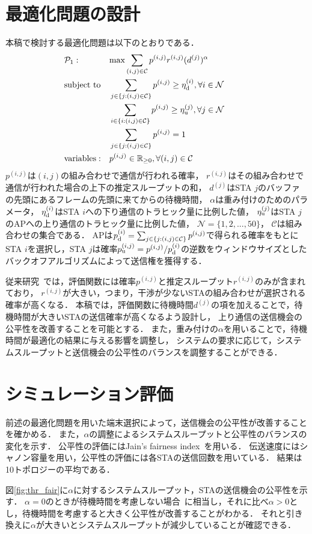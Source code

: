 \documentclass[twocolumn, a4paper]{ieicejsp}
\begin{document}
\section{最適化問題の設計 \label{方法}}
本稿で検討する最適化問題は以下のとおりである．
\begin{align}
	&{\mathcal P}_1: && {\rm max} \sum_{(i,j)\in{\mathcal C}} p^{(i,j)}r^{(i,j)}(d^{(j)})^{\alpha} &&&&&& \\
	&{\rm subject\ to} && \sum_{j\in\{j:(i,j)\in{\mathcal C}\}} p^{(i,j)} \geq \eta_{\rm d}^{(i)}, \forall i\in {\mathcal N}  \\
	&&& \sum_{i\in\{i:(i,j)\in{\mathcal C}\}} p^{(i,j)} \geq \eta_{\rm u}^{(j)}, \forall j\in {\mathcal N}  \\
	&&& \sum_{j\in\{j:(i,j)\in{\mathcal C}\}} p^{(i,j)}=1 \\
	&{\rm variables:} && p^{(i,j)} \in {\mathbb R}_{\geq 0},\forall(i,j)\in {\mathcal C}
\end{align}
$p^{(i,j)}$は$(i,j)$の組み合わせで通信が行われる確率，
$r^{(i,j)}$はその組み合わせで通信が行われた場合の上下の推定スループットの和，
$d^{(j)}$はSTA $j$のバッファの先頭にあるフレームの先頭に来てからの待機時間，
$\alpha$は重み付けのためのパラメータ，
$\eta_{\rm d}^{(i)}$はSTA $i$への下り通信のトラヒック量に比例した値，
$\eta_{\rm u}^{(j)}$はSTA $j$のAPへの上り通信のトラヒック量に比例した値，
${\mathcal N} = \{1,2,...,50\}$，
${\mathcal C}$は組み合わせの集合である．
APは$p_{\rm d}^{(i)}=\sum_{j\in\{j:(i,j)\in{\mathcal C}\}}p^{(i,j)}$で得られる確率をもとにSTA $i$を選択し，STA $j$は確率$p_{\rm u}^{(i,j)}=p^{(i,j)}/p_{\rm d}^{(i)}$の逆数をウィンドウサイズとしたバックオフアルゴリズムによって送信権を獲得する．
\par
従来研究~\cite{promac}では，評価関数には確率$p^{(i,j)}$と推定スループット$r^{(i,j)}$のみが含まれており，
$r^{(i,j)}$が大きい，つまり，干渉が少ないSTAの組み合わせが選択される確率が高くなる．
本稿では，評価関数に待機時間$d^{(j)}$の項を加えることで，待機時間が大きいSTAの送信確率が高くなるよう設計し，
上り通信の送信機会の公平性を改善することを可能とする．
また，重み付けの$\alpha$を用いることで，待機時間が最適化の結果に与える影響を調整し，
システムの要求に応じて，システムスループットと送信機会の公平性のバランスを調整することができる．

\section{シミュレーション評価 \label{評価}}
前述の最適化問題を用いた端末選択によって，送信機会の公平性が改善することを確かめる．
また，$\alpha$の調整によるシステムスループットと公平性のバランスの変化を示す．
公平性の評価にはJain's fairness index~\cite{fair}を用いる．
伝送速度にはシャノン容量を用い，公平性の評価には各STAの送信回数を用いている．
結果は10トポロジーの平均である．
\par
図\ref{fig:thr_fair}に$\alpha$に対するシステムスループット，STAの送信機会の公平性を示す．
$\alpha=0$のときが待機時間を考慮しない場合~\cite{promac}に相当し，それに比べ$\alpha>0$とし，待機時間を考慮すると大きく公平性が改善することがわかる．
それと引き換えに$\alpha$が大きいとシステムスループットが減少していることが確認できる．
\end{document}
